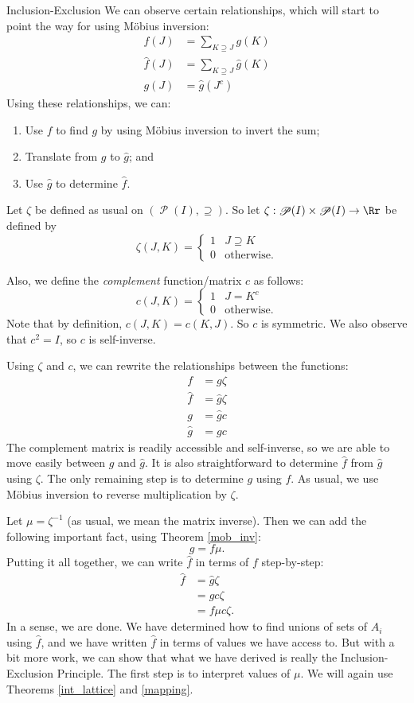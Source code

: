 \documentclass[12pt]{pom_thesis}
\DeclareMathOperator{\ps}{\mathscr{P}}
\begin{document}
\begin{chapter}{Inclusion-Exclusion}
We can observe certain relationships, which will start to point the way for using M\"obius inversion:
\begin{align*}
f(J) &= \sum_{K \supseteq J} g(K)\\
\hat{f}(J) &= \sum_{K \supseteq J} \hat{g}(K)\\
g(J) &= \hat{g}(J^c)
\end{align*}
Using these relationships, we can:
\begin{enumerate}
\item Use $f$ to find $g$ by using M\"obius inversion to invert the sum;
\item Translate from $g$ to $\hat{g}$; and
\item Use $\hat{g}$ to determine $\hat{f}$.
\end{enumerate}

Let $\zeta$ be defined as usual on $(\ps(I), \supseteq)$. So let $\zeta:\ps(I) \times \ps(I) \rightarrow \Rr$ be defined by
\[
\zeta(J,K) = \begin{cases} 1 & J \supseteq K \\ 0 & \text{otherwise}. \end{cases}
\]

Also, we define the \emph{complement} function/matrix $c$ as follows: %
\[
c(J,K) = \begin{cases} 1 & J = K^c \\ 0 & \text{otherwise}. \end{cases}
\]
Note that by definition, $c(J,K) = c(K,J)$. So $c$ is symmetric. We also observe that $c^2 = I$, so $c$ is self-inverse. 

Using $\zeta$ and $c$, we can rewrite the relationships between the functions:
\begin{align*}
f &= g\zeta\\
\hat{f} &= \hat{g}\zeta\\
g &= \hat{g}c\\
\hat{g} &= gc
\end{align*}
The complement matrix is readily accessible and self-inverse, so we are able to move easily between $g$ and $\hat{g}$. It is also straightforward to determine $\hat{f}$ from $\hat{g}$ using $\zeta$. The only remaining step is to determine $g$ using $f$. As usual, we use M\"obius inversion to reverse multiplication by $\zeta$.

Let $\mu = \zeta^{-1}$ (as usual, we mean the matrix inverse). Then we can add the following important fact, using Theorem \ref{mob_inv}:
\[
g = f\mu.
\]
Putting it all together, we can write $\hat{f}$ in terms of $f$ step-by-step:
\begin{align*}
\hat{f} &= \hat{g}\zeta\\
&= gc\zeta\\
&= f\mu c\zeta.
\end{align*}
In a sense, we are done. We have determined how to find unions of sets of $A_i$ using $\hat{f}$, and we have written $\hat{f}$ in terms of values we have access to. But with a bit more work, we can show that what we have derived is really the Inclusion-Exclusion Principle. The first step is to interpret values of $\mu$. We will again use Theorems \ref{int_lattice} and \ref{mapping}. 


\end{chapter}
\end{document}
